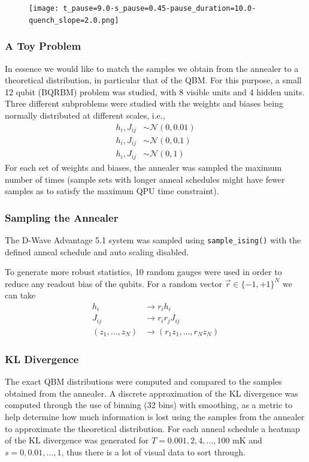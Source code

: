 \documentclass{beamer}
\begin{document}
\begin{frame}
    \begin{figure}
        \texttt{[image: t\_pause=9.0-s\_pause=0.45-pause\_duration=10.0-quench\_slope=2.0.png]}
    \end{figure}
\end{frame}

\begin{frame}
    \frametitle{A Toy Problem}
    In essence we would like to match the samples we obtain from the annealer to a theoretical distribution, in particular that of the QBM.
    For this purpose, a small 12 qubit (BQRBM) problem was studied, with 8 visible units and 4 hidden units.
    Three different subproblems were studied with the weights and biases being normally distributed at different scales, i.e.,
    \begin{align*}
        h_i, J_{ij} &\sim \mathcal{N}(0, 0.01) \\
        h_i, J_{ij} &\sim \mathcal{N}(0, 0.1) \\
        h_i, J_{ij} &\sim \mathcal{N}(0, 1)
    \end{align*}
    For each set of weights and biases, the annealer was sampled the maximum number of times (sample sets with longer anneal schedules might have fewer samples as to satisfy the maximum QPU time constraint).
\end{frame}

\begin{frame}
    \frametitle{Sampling the Annealer}
    The D-Wave Advantage 5.1 system was sampled using \texttt{sample\_ising()} with the defined anneal schedule and auto scaling disabled.

    To generate more robust statistics, 10 random gauges were used in order to reduce any readout bias of the qubits.
    For a random vector \( \vec{r} \in \{-1,+1\}^{N} \) we can take
    \begin{align*}
        h_i &\rightarrow r_i h_i \\
        J_{ij} &\rightarrow r_i r_j J_{ij} \\
        (z_1, \dots, z_N) &\rightarrow (r_1 z_1, \dots, r_N z_N)
    \end{align*}
\end{frame}

\begin{frame}
    \frametitle{KL Divergence}
    The exact QBM distributions were computed and compared to the samples obtained from the annealer.
    A discrete approximation of the KL divergence was computed through the use of binning (32 bins) with smoothing, as a metric to help determine how much information is lost using the samples from the annealer to approximate the theoretical distribution.
    For each anneal schedule a heatmap of the KL divergence was generated for \( T = 0.001, 2, 4, \dots, 100 \) mK and \( s = 0, 0.01, \dots, 1 \), thus there is a lot of visual data to sort through.
\end{frame}
\end{document}
